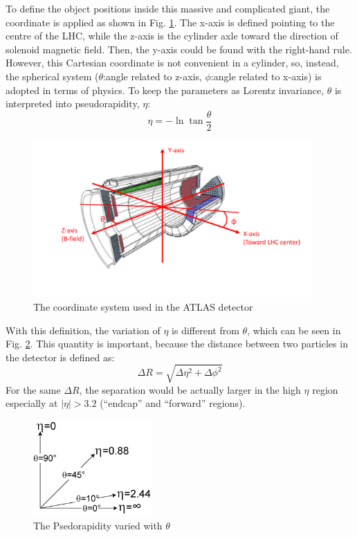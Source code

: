 To define the object positions inside this massive and complicated giant, the coordinate is applied as shown in Fig. \ref{Fig:coordinate}. The x-axis is defined pointing to the centre of the LHC, while the z-axis is the cylinder axle toward the direction of solenoid magnetic field. Then, the y-axis could be found with the right-hand rule. However, this Cartesian coordinate is not convenient in a cylinder, so, instead, the spherical system ($\theta$:angle related to z-axis, $\phi$:angle related to x-axis) is adopted in terms of physics. To keep the parameters as Lorentz invariance, $\theta$ is interpreted into pseudorapidity, $\eta$:
\begin{equation}
\eta = -\ln{\tan{\frac{\theta}{2}}}
\end{equation}
\begin{figure}[!h]                
	\includegraphics[width=0.95\textwidth]{Chapter2/coordinate}
	\centering
	\begin{center}
		\caption{The coordinate system used in the ATLAS detector}
		\label{Fig:coordinate}            
	\end{center}
\end{figure}
With this definition, the variation of $\eta$ is different from $\theta$, which can be seen in Fig. \ref{Fig:pseudorapidity}. This quantity is important, because the distance between two particles in the detector is defined as:
\begin{equation}
\Delta R= \sqrt{\Delta \eta^{2}+\Delta \phi^{2}}
\end{equation}
For the same $\Delta R$, the separation would be actually larger in the high $\eta$ region especially at $|\eta|>3.2$ (``endcap'' and ``forward'' regions).  
\begin{figure}[!h]                
	\includegraphics[width=0.4\textwidth]{Chapter2/pseudorapidity.png}
	\centering
	\begin{center}
		\caption{The Psedorapidity varied with $\theta$}
		\label{Fig:pseudorapidity}            
	\end{center}
\end{figure}

